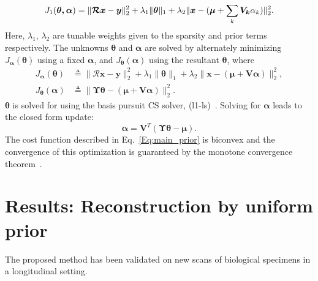 \documentclass[journal]{IEEEtran}
\begin{document}
 \begin{equation}
   \setlength{\belowdisplayskip}{0pt} \setlength{\belowdisplayshortskip}{0pt}
\setlength{\abovedisplayskip}{-2pt} \setlength{\abovedisplayshortskip}{-2pt}
J_1(\boldsymbol{\theta,\alpha}) = \lVert\boldsymbol{\mathcal{R} x}- \boldsymbol{y}\rVert_2^2  + \lambda_1\lVert\boldsymbol{\theta}\rVert_1+\lambda_2\lVert\boldsymbol{x} - (\boldsymbol{\mu} + \sum_{k}\boldsymbol{V_k}\alpha_k)\rVert_2^2.
\label{Eq:main_prior}
\end{equation}
Here, $\lambda_1$, $\lambda_2$ are tunable weights given to the sparsity and prior terms respectively. The unknowns $\boldsymbol{\theta}$ and $\boldsymbol{\alpha}$
are solved by alternately minimizing $J_{\boldsymbol{\alpha}}(\boldsymbol{\theta})$ using a fixed $\boldsymbol{\alpha}$, and $J_{\boldsymbol\theta}(\boldsymbol{\alpha})$ using the resultant $\boldsymbol{\theta}$, where 
\begin{align}
J_{\boldsymbol{\alpha}}(\boldsymbol{\theta}) &\triangleq \lVert\boldsymbol{\mathcal{R} x- y}\rVert_2^2  + \lambda_1\lVert\boldsymbol{\theta}\rVert_1+\lambda_2\lVert\boldsymbol{x} - (\boldsymbol{\mu + V\alpha})\rVert_2^2, \\
J_{\boldsymbol\theta}(\boldsymbol{\alpha}) &\triangleq \lVert\boldsymbol{\Upsilon\theta} - (\boldsymbol{\mu + V\alpha})\rVert_2^2.
\end{align}
$\boldsymbol{\theta}$ is solved for using the basis pursuit CS solver, (l1-ls)~\cite{l1ls}. Solving for $\boldsymbol{\alpha}$ leads to the closed form update:
\begin{equation}
\boldsymbol{\boldsymbol{\alpha}} = \boldsymbol{V}^T(\boldsymbol{\Upsilon \theta} -\boldsymbol{\mu}).
\end{equation}
The cost function described in Eq.~\ref{Eq:main_prior} is biconvex and the convergence of this optimization is guaranteed by the monotone convergence theorem~\cite{monotone}.
 \vspace{2mm}

 \section{Results: Reconstruction by uniform prior}
 \label{sec:results_uniform_prior}

 
 The proposed method has been validated on new scans of biological
 specimens in a longitudinal setting. 
\end{document}
